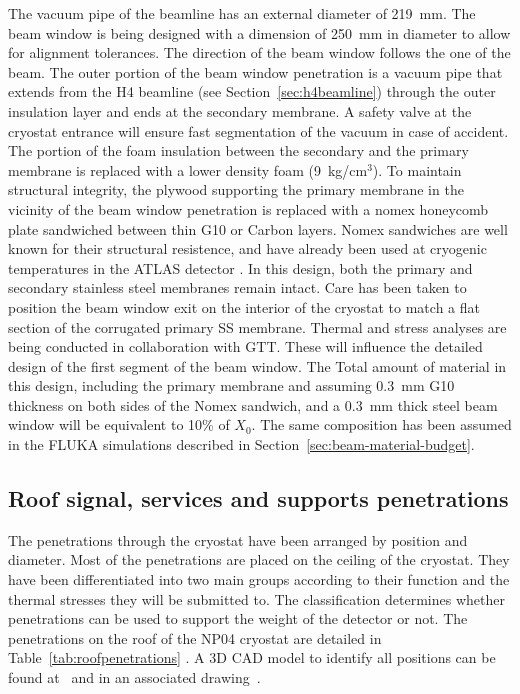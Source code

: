   The vacuum pipe of the beamline has an external diameter of 219~mm. The beam window is being designed with a dimension of 250~mm in diameter to allow for alignment tolerances.  The direction of the beam window follows the one of the beam.
The outer portion of the
beam window penetration is a vacuum pipe that extends from the H4 beamline (see Section~\ref{sec:h4beamline})  through the outer insulation layer and ends at the secondary
membrane. A safety valve at the cryostat entrance will ensure fast segmentation of the vacuum in case of accident.   The
portion of the foam insulation between the secondary and the primary
membrane is replaced with a lower density foam (9~kg/cm$^3$).
To maintain structural integrity, the plywood supporting
the primary membrane in the vicinity of the beam window penetration is
replaced with a nomex honeycomb plate  sandwiched between thin G10 or Carbon layers. Nomex sandwiches are well known for their structural resistence, and have already been used at cryogenic temperatures in  the ATLAS detector .
 In this design, both the
primary and secondary stainless steel membranes remain intact. Care has been taken to position the beam window exit on the interior of the cryostat to match a flat section of the corrugated primary SS membrane.
Thermal and stress analyses are being conducted in collaboration with GTT. These will influence the detailed design of the first segment of the beam window. 
The Total amount of material in this design, including the primary membrane and assuming 0.3~mm G10 thickness on both sides of the Nomex sandwich, and a 0.3~mm thick steel beam window will be equivalent to 10\% of $X_0$. The same composition has been assumed in the FLUKA simulations described in Section~\ref{sec:beam-material-budget}. 

\subsection{Roof signal, services and supports penetrations}

The penetrations through the cryostat have been arranged by position and diameter. %
Most of the penetrations are placed on the ceiling of the cryostat. They have been differentiated into two main groups according to their function and the thermal stresses they will be submitted to. The classification determines whether penetrations can be used to support the weight of the detector or not.
The penetrations on the roof of the NP04 cryostat are detailed in Table~\ref{tab:roofpenetrations} .  
A 3D CAD model to identify all positions can be found at~\cite{edms4} and in an associated drawing~\cite{edms5}.


